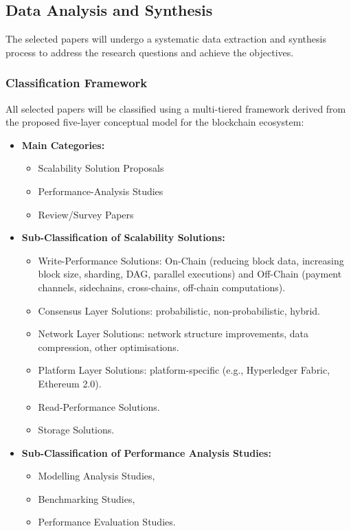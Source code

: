 \subsection{Data Analysis and Synthesis}
The selected papers will undergo a systematic data extraction and synthesis process to address the research questions and achieve the objectives.

\subsubsection{Classification Framework}
All selected papers will be classified using a multi-tiered framework derived from the proposed five-layer conceptual model for the blockchain ecosystem:
\begin{itemize}
    \item \textbf{Main Categories:}
    \begin{itemize}
        \item Scalability Solution Proposals
        \item Performance-Analysis Studies
        \item Review/Survey Papers
    \end{itemize}
    \item \textbf{Sub-Classification of Scalability Solutions:}
    \begin{itemize}
        \item Write-Performance Solutions: On-Chain (reducing block data, increasing block size, sharding, DAG, parallel executions) and Off-Chain (payment channels, sidechains, cross-chains, off-chain computations).
        \item Consensus Layer Solutions: probabilistic, non-probabilistic, hybrid.
        \item Network Layer Solutions: network structure improvements, data compression, other optimisations.
        \item Platform Layer Solutions: platform-specific (e.g., Hyperledger Fabric, Ethereum 2.0).
        \item Read-Performance Solutions.
        \item Storage Solutions.
    \end{itemize}
    \item \textbf{Sub-Classification of Performance Analysis Studies:}
    \begin{itemize}
        \item Modelling Analysis Studies,
        \item Benchmarking Studies,
        \item Performance Evaluation Studies.
    \end{itemize}
\end{itemize}

